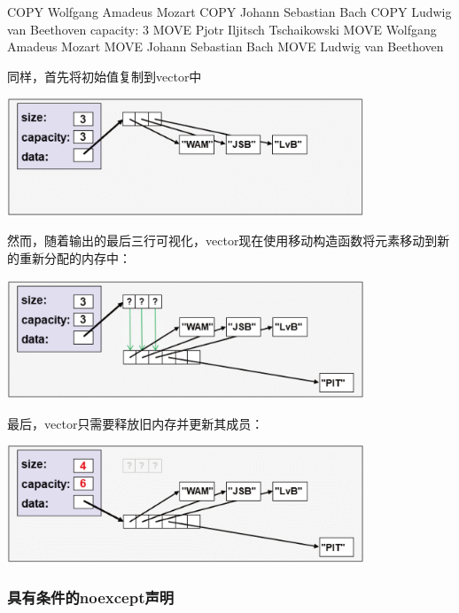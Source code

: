 \begin{outputcode}
COPY Wolfgang Amadeus Mozart
COPY Johann Sebastian Bach
COPY Ludwig van Beethoven
capacity: 3
MOVE Pjotr Iljitsch Tschaikowski
MOVE Wolfgang Amadeus Mozart
MOVE Johann Sebastian Bach
MOVE Ludwig van Beethoven
\end{outputcode}

同样，首先将初始值复制到vector中

\begin{center}
	\includegraphics[width=0.8\textwidth]{part1/ch7/images/4}
\end{center}

然而，随着输出的最后三行可视化，vector现在使用移动构造函数将元素移动到新的重新分配的内存中：

\begin{center}
	\includegraphics[width=0.8\textwidth]{part1/ch7/images/5}
\end{center}

最后，vector只需要释放旧内存并更新其成员：

\begin{center}
	\includegraphics[width=0.8\textwidth]{part1/ch7/images/6}
\end{center}

\subsubsection{具有条件的noexcept声明}

